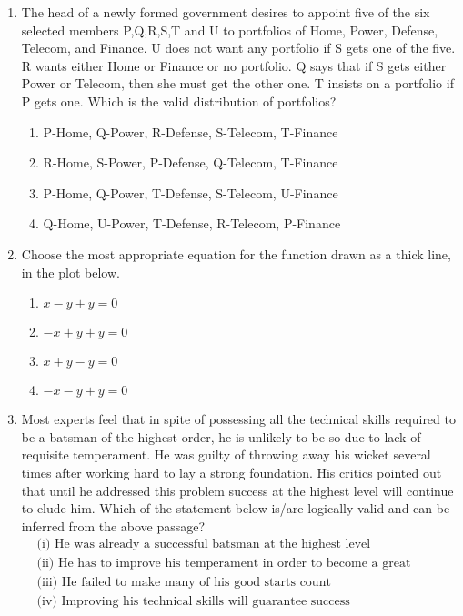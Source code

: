 \documentclass[journal,12pt,onecolumn]{IEEEtran}
\theoremstyle{remark}
\begin{document}
\begin{enumerate}
		\item The head of a newly formed government desires to appoint five of the six selected members P,Q,R,S,T and U to portfolios of Home, Power, Defense, Telecom, and Finance. U does not want any portfolio if S gets one of the five. R wants either Home or Finance or no portfolio. Q says that if S gets either Power or Telecom, then she must get the other one. T insists on a portfolio if P gets one. Which is the valid distribution of portfolios?
		
		\hfill{}
		
		\begin{enumerate}
			\item P-Home, Q-Power, R-Defense, S-Telecom, T-Finance
			\item R-Home, S-Power, P-Defense, Q-Telecom, T-Finance
			\item P-Home, Q-Power, T-Defense, S-Telecom, U-Finance
			\item Q-Home, U-Power, T-Defense, R-Telecom, P-Finance
		\end{enumerate}
		
		\item Choose the most appropriate equation for the function drawn as a thick line, in the plot below.
		
		
		\hfill{}
		
		\begin{enumerate}
			\item $x - y + y = 0$
			\item $-x + y + y = 0$
			\item $x + y - y = 0$
			\item $-x - y + y = 0$
		\end{enumerate}
		
		\item Most experts feel that in spite of possessing all the technical skills required to be a batsman of the highest order, he is unlikely to be so due to lack of requisite temperament. He was guilty of throwing away his wicket several times after working hard to lay a strong foundation. His critics pointed out that until he addressed this problem success at the highest level will continue to elude him. Which of the statement below is/are logically valid and can be inferred from the above passage?
		\begin{align*}
			&\text{(i) He was already a successful batsman at the highest level}\\
			&\text{(ii) He has to improve his temperament in order to become a great batsman}\\
			&\text{(iii) He failed to make many of his good starts count}\\
			&\text{(iv) Improving his technical skills will guarantee success}
		\end{align*}
		

\end{enumerate}
\end{document}
